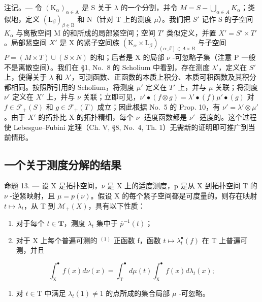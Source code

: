 注记。--- 令 \((\mathrm{K}_{\alpha})_{\alpha\in\mathrm{A}}\) 是 S 关于 \(\lambda\) 的一个分割，并令 \(M = S - \bigcup_{\alpha\in A} K_{\alpha}\)；类似地，定义 \((\mathrm{L}_{\beta})_{\beta\in\mathrm{B}}\) 和 N（针对 T 上的测度 \(\mu\)）。我们把 \(S'\) 记作 S 的子空间 \(K_{\alpha}\) 与离散空间 M 的和所成的局部紧空间；空间 \(T'\) 类似定义，并置 \(X' = S' \times T'\)。局部紧空间 \(X'\) 是 X 的紧子空间族 \((\mathrm{K}_{\alpha} \times \mathrm{L}_{\beta})_{(\alpha,\beta)\in A\times B}\) 与子空间 \(P = (M \times T) \cup (S \times N)\) 的和；后者是 X 的局部 \(\nu\) -可忽略子集（注意 P 一般不是离散空间）。我们在 §1, No.~8 的 Scholium 中看到，存在测度 \(\lambda'\)，定义在 \(S'\) 上，使得关于 \(\lambda\) 和 \(\lambda'\)，可测函数、正函数的本质上积分、本质可积函数及其积分都相同。按照所引用的 Scholium，将测度 \(\mu'\) 定义在 \(T'\) 上，并与 \(\mu\) 关联；将测度 \(\nu'\) 定义在 \(X'\) 上，并与 \(\nu\) 关联；立即可见，\(\nu'\bullet(f \otimes g) = \lambda'\bullet(f)\mu'\bullet(g)\) 对 \(f \in \mathcal{F}_{+}(S)\) 和 \(g \in \mathcal{F}_{+}(T)\) 成立；因此根据 No.~5 的 Prop. 10，有 \(\nu' = \lambda' \otimes \mu'\)。由于 \(X'\) 的拓扑比 X 的拓扑精细，每个 \(\nu\) -适度函数都是 \(\nu'\) -适度的。这个过程使 Lebesgue--Fubini 定理（Ch. V, §8, No.~4, Th. 1）无需新的证明即可推广到当前情形。

\subsection{一个关于测度分解的结果}

命题 13. --- 设 X 是拓扑空间，\(\nu\) 是 X 上的适度测度，p 是从 X 到拓扑空间 T 的 \(\nu\) -逆紧映射，且 \(\mu = p(\nu)\)。假设 X 的每个紧子空间都是可度量的。则存在映射 \(t \mapsto \lambda_{t}\)，从 T 到 \(\mathcal{M}_{+}(X)\)，具有以下性质：

\begin{enumerate}
\def\labelenumi{\alph{enumi})}
\item
  对于每个 \(t \in \mathbf{T}\)，测度 \(\lambda_t\) 集中于 \(\overline{p}^{-1}(t)\)；
\item
  对于 X 上每个普遍可测的 \(^{(1)}\) 正函数 f，函数 \(t \mapsto \lambda_{t}^{\bullet}(f)\) 在 T 上普遍可测，并且
\end{enumerate}

\[
\int_ {\mathrm{X}} ^ {\bullet} f (x) d \nu (x) = \int_ {\mathrm{T}} ^ {\bullet} d \mu (t) \int_ {\mathrm{X}} ^ {\bullet} f (x) d \lambda_ {t} (x);\tag{12}
\]

\begin{enumerate}
\def\labelenumi{\alph{enumi})}
\setcounter{enumi}{2}
\tightlist
\item
  对 \(t \in \mathrm{T}\) 中满足 \(\lambda_t(1) \neq 1\) 的点所成的集合局部 \(\mu\) -可忽略。
\end{enumerate}

